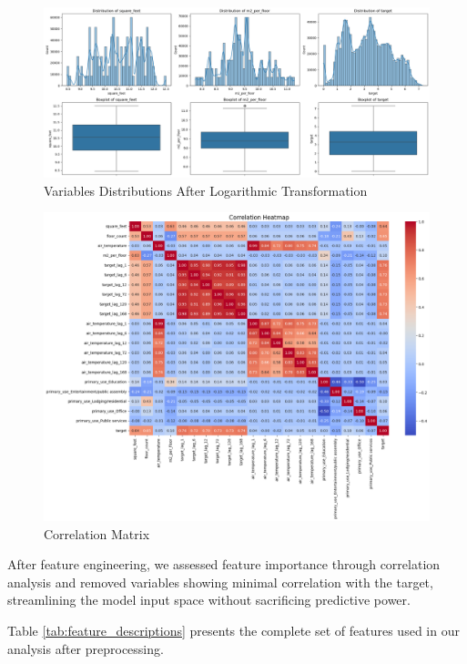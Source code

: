 \begin{figure}[!h]
\centering
\includegraphics[width=1\linewidth]{images/box_plot-destribution.png}
\caption{Variables Distributions After Logarithmic Transformation}
\label{fig:Variables Distributions After Logarithmic Transformation}
\end{figure}

\begin{figure}[!h]
    \centering
    \includegraphics[width=1\linewidth]{images/corr_matrix.png}
    \caption{Correlation Matrix}
    \label{fig:enter-label}
\end{figure}

After feature engineering, we assessed feature importance through correlation analysis and removed variables showing minimal correlation with the target, streamlining the model input space without sacrificing predictive power.


Table \ref{tab:feature_descriptions} presents the complete set of features used in our analysis after preprocessing.

